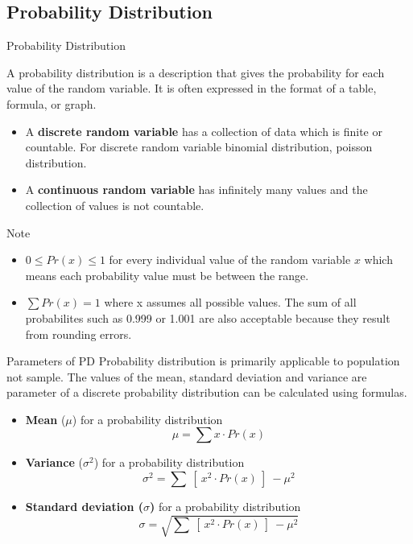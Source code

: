 \documentclass{beamer}
\begin{document}
\subsection{Probability Distribution}
\begin{frame}{Probability Distribution}
\begin{flushleft}
\hspace{0.4cm}
A probability distribution is a description that gives the
probability for each value of the random variable. It is often
expressed in the format of a table, formula, or graph.
\end{flushleft}
\begin{itemize}
    \item A \textbf{discrete random variable} has a collection of data which is finite or countable. For discrete random variable binomial distribution, poisson distribution.
    \item A \textbf{continuous random variable} has infinitely many values and the collection of values is not countable.
\end{itemize}
\begin{alertblock}{Note}
    \begin{itemize}
        
        \item $0 \leq Pr(x) \leq1$ for every individual value of the random variable $x$ which means each probability value must be between the range.
        \item $\sum  Pr(x)=1$ where x assumes all possible values. The sum of all probabilites such as 0.999 or 1.001 are also acceptable because they result from rounding errors.
        
    \end{itemize}
\end{alertblock}
   
\end{frame}

\begin{frame}{Parameters of PD}
Probability distribution is primarily applicable to population not sample. The values of the mean, standard deviation and variance are parameter of a discrete probability distribution can be calculated using formulas.
    \begin{itemize}
        \item \textbf{Mean} ($\mu$) for a probability distribution
        \begin{equation}
            \mu=\sum x \cdot Pr(x)
        \end{equation}
        \item \textbf{Variance} ($\sigma^2$) for a probability distribution
        \begin{equation}
            \sigma^2=\sum~[~x^2\cdot Pr(x)~]~-\mu^2
        \end{equation}
        \item \textbf{Standard deviation ($\sigma$)} for a probability distribution
        \begin{equation}
            \sigma=\sqrt{\sum~[~x^2\cdot Pr(x)~]~-\mu^2}
        \end{equation}
    \end{itemize}
\end{frame}
\end{document}
